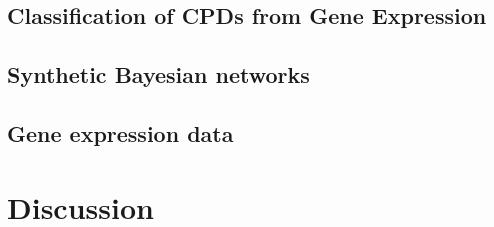 \documentclass{article} %
\begin{document}
\subsection{Classification of CPDs from Gene Expression}

\subsection{Synthetic Bayesian networks}

\subsection{Gene expression data}

\section{Discussion}

\begin{small}

%
%

\end{small}

%
\end{document}
